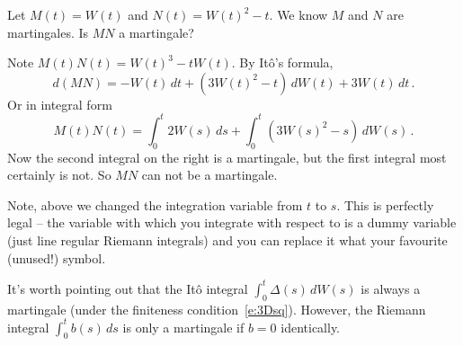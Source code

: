 \begin{example}
  Let $M(t) = W(t)$ and $N(t) = W(t)^2 - t$.
  We know $M$ and $N$ are martingales.
  Is $M N$ a martingale?
\end{example}
\begin{sol}
  Note $M(t) N(t) = W(t)^3 - t W(t)$.
  By It\^o's formula,
  \begin{equation*}
    d(MN) = - W(t) \, dt + (3 W(t)^2 - t) \, dW(t) + 3 W(t) \, dt \,.
  \end{equation*}
  Or in integral form
  \begin{equation*}
    M(t) N(t) = \int_0^t 2 W(s) \, ds + \int_0^t (3 W(s)^2 - s) \, dW(s)\,.
  \end{equation*}
  Now the second integral on the right is a martingale, but the first integral most certainly is not.
  So $MN$ can not be a martingale.
\end{sol}
\begin{remark}
  Note, above we changed the integration variable from $t$ to $s$.
  This is perfectly legal -- the variable with which you integrate with respect to is a dummy variable (just line regular Riemann integrals) and you can replace it what your favourite (unused!) symbol.
\end{remark}
\begin{remark}
  It's worth pointing out that the It\^o integral $\int_0^t \Delta(s) \, dW(s)$ is always a martingale (under the finiteness condition~\eqref{e:3Dsq}).
  However, the Riemann integral $\int_0^t b(s) \, ds$ is only a martingale if $b = 0$ identically.
\end{remark}

